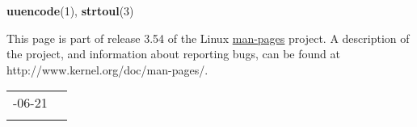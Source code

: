\documentclass[]{article}
\let\realtextbf=\textbf
\renewcommand{\textbf}[1]{\textcolor{boldcolor}{\realtextbf{#1}}}
\renewcommand{\emph}[1]{\underline{#1}}
\begin{document}
\textbf{uuencode}(1), \textbf{strtoul}(3)


This page is part of release 3.54 of the Linux \emph{man-pages} project.
A description of the project, and information about reporting bugs, can
be found at http://www.kernel.org/doc/man-pages/.

\begin{longtable}[c]{@{}ll@{}}
\toprule\addlinespace
2013-06-21 &
\\\addlinespace
\bottomrule
\end{longtable}
\end{document}
